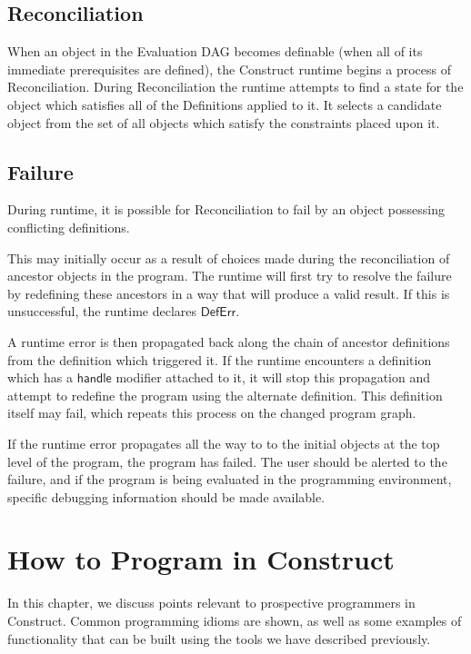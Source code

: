 \documentclass[twoside,11pt]{report}
\begin{document}
\section{Reconciliation}
\label{sec:reconc}

When an object in the Evaluation DAG becomes definable (when all of its immediate prerequisites are defined), the Construct runtime begins a process of Reconciliation. 
During Reconciliation the runtime attempts to find a state for the object which satisfies all of the Definitions applied to it. 
It selects a candidate object from the set of all objects which satisfy the constraints placed upon it.

\section{Failure}
\label{sec:failure}

During runtime, it is possible for Reconciliation to fail by an object possessing conflicting definitions. 

This may initially occur as a result of choices made during the reconciliation of ancestor objects in the program. 
The runtime will first try to resolve the failure by redefining these ancestors in a way that will produce a valid result. 
If this is unsuccessful, the runtime declares $\mathsf{DefErr}$.

A runtime error is then propagated back along the chain of ancestor definitions from the definition which triggered it. 
If the runtime encounters a definition which has a $\mathsf{handle}$ modifier attached to it, it will stop this propagation and attempt to redefine the program using the alternate definition.
This definition itself may fail, which repeats this process on the changed program graph.

If the runtime error propagates all the way to to the initial objects at the top level of the program, the program has failed. 
The user should be alerted to the failure, and if the program is being evaluated in the programming environment, specific debugging information should be made available.

\chapter{How to Program in Construct}
\label{chap:howto}

In this chapter, we discuss points relevant to prospective programmers in Construct. Common programming idioms are shown, as well as some examples of functionality that can be built using the tools we have described previously.
\end{document}
